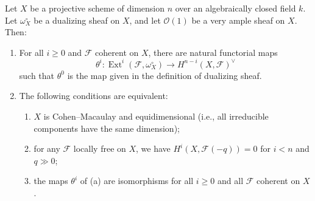 Let $X$ be a projective scheme of dimension $n$ over an algebraically closed field $k$. Let $\omega_X^\circ$ be a dualizing sheaf on $X$, and let $\mathcal{O}(1)$ be a very ample sheaf on $X$. Then:

\begin{enumerate}
\item[(a)] For all $i \geq 0$ and $\mathcal{F}$ coherent on $X$, there are natural functorial maps
$$\theta^i: \operatorname{Ext}^i(\mathcal{F}, \omega_X^\circ) \to H^{n-i}(X, \mathcal{F})^\vee$$
such that $\theta^0$ is the map given in the definition of dualizing sheaf.

\item[(b)] The following conditions are equivalent:
\begin{enumerate}
\item[(i)] $X$ is Cohen--Macaulay and equidimensional (i.e., all irreducible components have the same dimension);
\item[(ii)] for any $\mathcal{F}$ locally free on $X$, we have $H^i(X, \mathcal{F}(-q)) = 0$ for $i < n$ and $q \gg 0$;
\item[(iii)] the maps $\theta^i$ of (a) are isomorphisms for all $i \geq 0$ and all $\mathcal{F}$ coherent on $X$.
\end{enumerate}
\end{enumerate}
